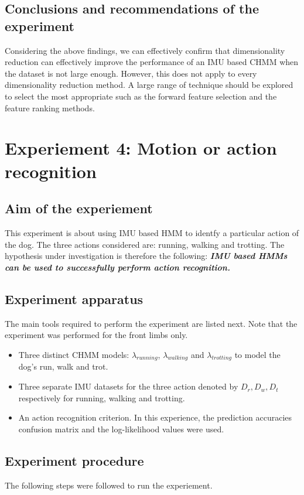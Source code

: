 \subsection{Conclusions and recommendations of the experiment}
Considering the above findings, we can effectively confirm that dimensionality reduction can effectively improve the performance of an IMU based CHMM when the dataset is not large enough. However, this does not apply to every dimensionality reduction method. A large range of technique should be explored to select the most appropriate such as the forward feature selection and the feature ranking methods.

\section{Experiement 4: Motion or action recognition}  \label{exp:motion}

\subsection{Aim of the experiement}
This experiment is about using IMU based HMM to identfy a particular action of the dog. The three actions considered are: running, walking and trotting.
The hypothesis under investigation is therefore the following:
\textbf{\textit{IMU based HMMs can be used to successfully perform action recognition.}}

\subsection{Experiment apparatus}
The main tools required to perform the experiment are listed next. Note that the experiment was performed for the front limbs only.
\begin{itemize}
	\item Three distinct CHMM models: \(\lambda_{running}\), \(\lambda_{walking}\) and \(\lambda_{trotting}\) to model the dog's run, walk and trot.
	\item Three separate IMU datasets for the three action denoted by \(D_r, D_w, D_t\) respectively for running, walking and trotting.
	\item An action recognition criterion. In this experience, the prediction accuracies confusion matrix and the log-likelihood values were used.
\end{itemize}

\subsection{Experiment procedure}
The following steps were followed to run the experiement.


